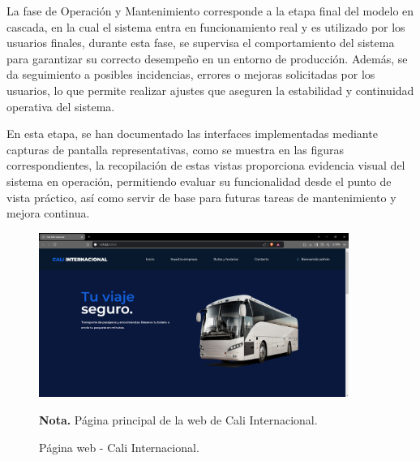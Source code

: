 	La fase de Operación y Mantenimiento corresponde a la etapa final del modelo en cascada, en la cual el sistema entra en funcionamiento real y es utilizado por los usuarios finales, durante esta fase, se supervisa el comportamiento del sistema para garantizar su correcto desempeño en un entorno de producción. Además, se da seguimiento a posibles incidencias, errores o mejoras solicitadas por los usuarios, lo que permite realizar ajustes que aseguren la estabilidad y continuidad operativa del sistema.
 	
 	En esta etapa, se han documentado las interfaces implementadas mediante capturas de pantalla representativas, como se muestra en las figuras correspondientes, la recopilación de estas vistas proporciona evidencia visual del sistema en operación, permitiendo evaluar su funcionalidad desde el punto de vista práctico, así como servir de base para futuras tareas de mantenimiento y mejora continua.
 
 \begin{figure}[!h] %
 	\caption[Página web - Cali Internacional]
 	{\newline Página web - Cali Internacional.} %
 	\centering
 	\includegraphics[width=0.9\textwidth]{imagenes/cap_3/Img_calibus/CALIBUS00.png} %
 	\begin{flushleft}
 		\begin{doublespace}
 			\hspace{1.20cm} \textbf{Nota.} Página principal de la web de Cali Internacional. %
 		\end{doublespace}
 	\end{flushleft}
 	\vspace{-40pt} %
 	\label{fig:cali00} %
 \end{figure}
 
